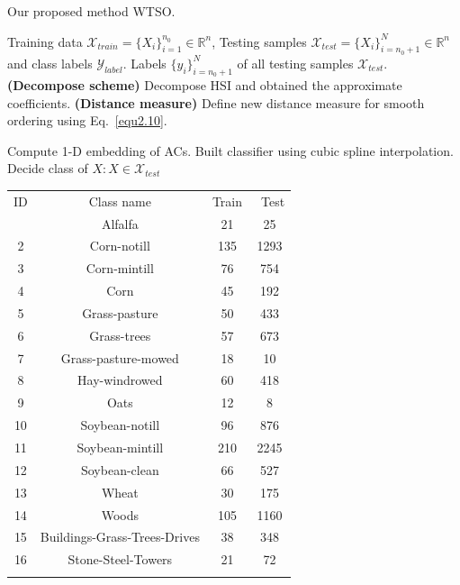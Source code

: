 \documentclass{ws-ijwmip}
\begin{document}
\begin{algorithm}
	\renewcommand{\algorithmicrequire}{\textbf{Input:}}
	\renewcommand{\algorithmicensure}{\textbf{Output:}}
	\caption{Our proposed method WTSO.}
	\label{alg:1}
	\begin{algorithmic}[1]
		\REQUIRE Training data $\mathcal{X}_{train}=\{X_i\}_{i=1}^{n_0}\in \mathbb{R}^n$, Testing samples $\mathcal{X}_{test}=\{X_i\}_{i=n_0+1}^N\in \mathbb{R}^n$ and class labels $\mathcal{Y}_{label}$.
		\ENSURE Labels $\{y_i\}_{i=n_0+1}^N$ of all testing samples $\mathcal{X}_{test}$.
		\STATE \textbf{(Decompose scheme)} Decompose HSI and obtained the approximate coefficients.
		\STATE \textbf{(Distance measure)} Define new distance measure for smooth ordering using Eq.~\ref{equ2.10}.

		\STATE Compute 1-D embedding of ACs.
		\STATE Built classifier using cubic spline interpolation.
		\ENDFOR
		\STATE Decide class of $X:X\in \mathcal{X}_{test} $
	\end{algorithmic}
\end{algorithm}

\begin{table}[ht]

{\begin{tabular}{@{}cccc@{}} \toprule
ID & Class name & Train &
\ Test \\
  \colrule
1 & Alfalfa & 21 & 25 \\
         2 & Corn-notill	& 135 & 1293 \\
         3 & Corn-mintill	& 76 & 754 \\
         4 & Corn & 45 & 192 \\
         5 & Grass-pasture	 & 50 & 433 \\
         6 & Grass-trees	 & 57 & 673 \\
         7 & Grass-pasture-mowed	 & 18 & 10 \\
         8 & Hay-windrowed	 & 60 & 418 \\
         9 & Oats	 & 12 & 8 \\
         10 & Soybean-notill & 96 & 876 \\
         11 & Soybean-mintill & 210 & 2245 \\
         12 & Soybean-clean	 & 66 & 527 \\
         13 & Wheat	 & 30 & 175 \\
         14 & Woods	 & 105 & 1160 \\
         15 & Buildings-Grass-Trees-Drives	 & 38 & 348 \\
         16 & Stone-Steel-Towers& 21 & 72 \\ \botrule
\end{tabular}}
\label{table1}
\end{table}
\end{document}
